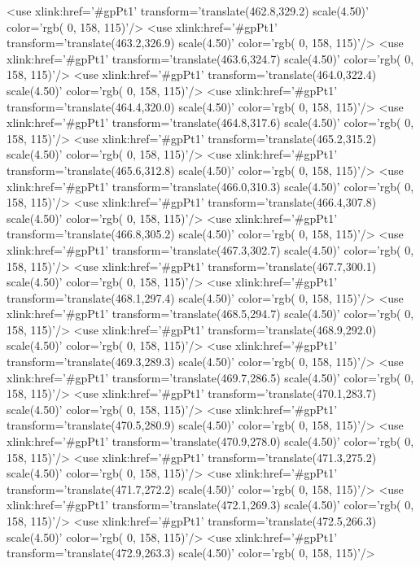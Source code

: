 	<use xlink:href='#gpPt1' transform='translate(462.8,329.2) scale(4.50)' color='rgb(  0, 158, 115)'/>
	<use xlink:href='#gpPt1' transform='translate(463.2,326.9) scale(4.50)' color='rgb(  0, 158, 115)'/>
	<use xlink:href='#gpPt1' transform='translate(463.6,324.7) scale(4.50)' color='rgb(  0, 158, 115)'/>
	<use xlink:href='#gpPt1' transform='translate(464.0,322.4) scale(4.50)' color='rgb(  0, 158, 115)'/>
	<use xlink:href='#gpPt1' transform='translate(464.4,320.0) scale(4.50)' color='rgb(  0, 158, 115)'/>
	<use xlink:href='#gpPt1' transform='translate(464.8,317.6) scale(4.50)' color='rgb(  0, 158, 115)'/>
	<use xlink:href='#gpPt1' transform='translate(465.2,315.2) scale(4.50)' color='rgb(  0, 158, 115)'/>
	<use xlink:href='#gpPt1' transform='translate(465.6,312.8) scale(4.50)' color='rgb(  0, 158, 115)'/>
	<use xlink:href='#gpPt1' transform='translate(466.0,310.3) scale(4.50)' color='rgb(  0, 158, 115)'/>
	<use xlink:href='#gpPt1' transform='translate(466.4,307.8) scale(4.50)' color='rgb(  0, 158, 115)'/>
	<use xlink:href='#gpPt1' transform='translate(466.8,305.2) scale(4.50)' color='rgb(  0, 158, 115)'/>
	<use xlink:href='#gpPt1' transform='translate(467.3,302.7) scale(4.50)' color='rgb(  0, 158, 115)'/>
	<use xlink:href='#gpPt1' transform='translate(467.7,300.1) scale(4.50)' color='rgb(  0, 158, 115)'/>
	<use xlink:href='#gpPt1' transform='translate(468.1,297.4) scale(4.50)' color='rgb(  0, 158, 115)'/>
	<use xlink:href='#gpPt1' transform='translate(468.5,294.7) scale(4.50)' color='rgb(  0, 158, 115)'/>
	<use xlink:href='#gpPt1' transform='translate(468.9,292.0) scale(4.50)' color='rgb(  0, 158, 115)'/>
	<use xlink:href='#gpPt1' transform='translate(469.3,289.3) scale(4.50)' color='rgb(  0, 158, 115)'/>
	<use xlink:href='#gpPt1' transform='translate(469.7,286.5) scale(4.50)' color='rgb(  0, 158, 115)'/>
	<use xlink:href='#gpPt1' transform='translate(470.1,283.7) scale(4.50)' color='rgb(  0, 158, 115)'/>
	<use xlink:href='#gpPt1' transform='translate(470.5,280.9) scale(4.50)' color='rgb(  0, 158, 115)'/>
	<use xlink:href='#gpPt1' transform='translate(470.9,278.0) scale(4.50)' color='rgb(  0, 158, 115)'/>
	<use xlink:href='#gpPt1' transform='translate(471.3,275.2) scale(4.50)' color='rgb(  0, 158, 115)'/>
	<use xlink:href='#gpPt1' transform='translate(471.7,272.2) scale(4.50)' color='rgb(  0, 158, 115)'/>
	<use xlink:href='#gpPt1' transform='translate(472.1,269.3) scale(4.50)' color='rgb(  0, 158, 115)'/>
	<use xlink:href='#gpPt1' transform='translate(472.5,266.3) scale(4.50)' color='rgb(  0, 158, 115)'/>
	<use xlink:href='#gpPt1' transform='translate(472.9,263.3) scale(4.50)' color='rgb(  0, 158, 115)'/>
